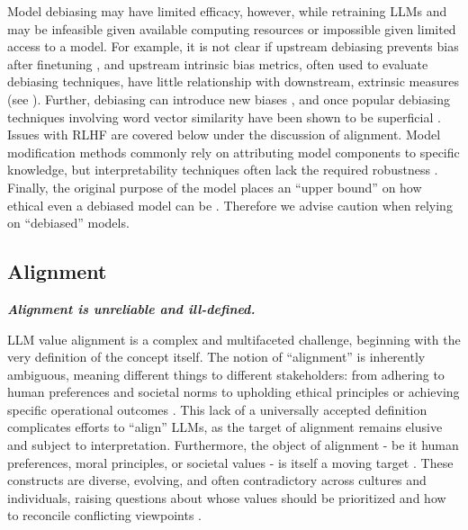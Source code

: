 Model debiasing may have limited efficacy, however, while retraining LLMs and may be infeasible given available computing resources or impossible given limited access to a model. For example, it is not clear if upstream debiasing prevents bias after finetuning \citep{steed_upstream_2022} \citep[cf.][]{liang_towards_2020}, and upstream intrinsic bias metrics, often used to evaluate debiasing techniques, have little relationship with downstream, extrinsic measures \citep{cao_intrinsic_2022,goldfarb-tarrant_intrinsic_2021, delobelle_measuring_2022} (see ). Further, debiasing can introduce new biases \citep{xu_detoxifying_2021}, and once popular debiasing techniques involving word vector similarity have been shown to be superficial \citep{gonen_lipstick_2019}. Issues with RLHF are covered below under the discussion of alignment. Model modification methods commonly rely on attributing model components to specific knowledge, but interpretability techniques often lack the required robustness \citep{anwar2024foundational}. Finally, the original purpose of the model places an ``upper bound'' on how ethical even a debiased model can be \citep{kasirzadeh2021ethical}. Therefore we advise caution when relying on ``debiased'' models.

\subsection{Alignment}
\noindent\textbf{\textit{Alignment is unreliable and ill-defined.}}
\newline 

\noindent LLM value alignment is a complex and multifaceted challenge, beginning with the very definition of the concept itself. The notion of ``alignment'' is inherently ambiguous, meaning different things to different stakeholders: from adhering to human preferences and societal norms to upholding ethical principles or achieving specific operational outcomes \citep{hendrycks_aligning_2020,gabriel2020artificial,kasirzadeh2023conversation,kirk2023empty,anwar2024foundational}. This lack of a universally accepted definition complicates efforts to ``align'' LLMs, as the target of alignment remains elusive and subject to interpretation. Furthermore, the object of alignment - be it human preferences, moral principles, or societal values - is itself a moving target \citep{anwar2024foundational}. These constructs are diverse, evolving, and often contradictory across cultures and individuals, raising questions about whose values should be prioritized and how to reconcile conflicting viewpoints \citep{askell2021general,sorensen2024roadmap,pistilli2024civics}. 

